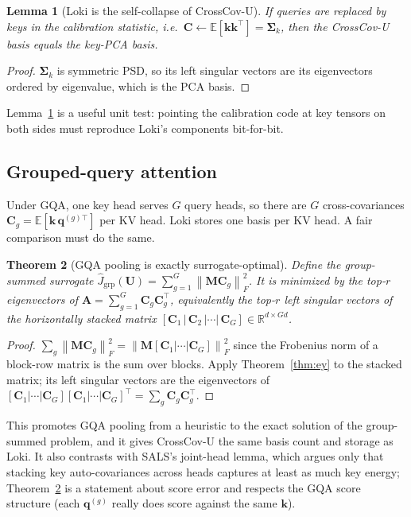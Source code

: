 \documentclass[10pt]{article}
\newcommand{\R}{\mathbb{R}}
\newcommand{\E}{\mathbb{E}}
\newcommand{\norm}[1]{\left\lVert #1 \right\rVert}
\newcommand{\fro}[1]{\norm{#1}_F}
\newcommand{\bq}{\mathbf{q}}
\newcommand{\bk}{\mathbf{k}}
\newcommand{\bU}{\mathbf{U}}
\newcommand{\bC}{\mathbf{C}}
\newcommand{\bM}{\mathbf{M}}
\newcommand{\Sk}{\bm{\Sigma}_k}
\newcommand{\method}{CrossCov-U}
\theoremstyle{plain}
\newtheorem{theorem}{Theorem}[section]
\newtheorem{lemma}[theorem]{Lemma}
\theoremstyle{definition}
\theoremstyle{remark}
\begin{document}
\begin{lemma}[Loki is the self-collapse of \method{}]
\label{lem:collapse}
If queries are replaced by keys in the calibration statistic, i.e.\
$\bC\leftarrow\E[\bk\bk^\top]=\Sk$, then the \method{} basis equals the key-PCA
basis.
\end{lemma}
\begin{proof}
$\Sk$ is symmetric PSD, so its left singular vectors are its eigenvectors
ordered by eigenvalue, which is the PCA basis.
\end{proof}
Lemma~\ref{lem:collapse} is a useful unit test: pointing the calibration code
at key tensors on both sides must reproduce Loki's components bit-for-bit.

\subsection{Grouped-query attention}
\label{sec:gqa}

Under GQA, one key head serves $G$ query heads, so there are $G$
cross-covariances $\bC_g=\E[\bk\,\bq^{(g)\top}]$ per KV head. Loki stores one
basis per KV head. A fair comparison must do the same.

\begin{theorem}[GQA pooling is exactly surrogate-optimal]
\label{thm:gqa}
Define the group-summed surrogate $\hat J_{\mathrm{grp}}(\bU)=\sum_{g=1}^G\fro{\bM\bC_g}^2$.
It is minimized by the top-$r$ eigenvectors of
$\mathbf{A}=\sum_{g=1}^G\bC_g\bC_g^\top$, equivalently the top-$r$ left
singular vectors of the horizontally stacked matrix
$[\bC_1\,|\,\bC_2\,|\cdots|\,\bC_G]\in\R^{d\times Gd}$.
\end{theorem}
\begin{proof}
$\sum_g\fro{\bM\bC_g}^2=\fro{\bM[\bC_1|\cdots|\bC_G]}^2$ since the Frobenius
norm of a block-row matrix is the sum over blocks. Apply
Theorem~\ref{thm:ey} to the stacked matrix; its left singular vectors are the
eigenvectors of $[\bC_1|\cdots|\bC_G][\bC_1|\cdots|\bC_G]^\top=\sum_g\bC_g\bC_g^\top$.
\end{proof}

This promotes GQA pooling from a heuristic to the exact solution of the
group-summed problem, and it gives \method{} the same basis count and storage
as Loki. It also contrasts with SALS's joint-head lemma, which argues only
that stacking key auto-covariances across heads captures at least as much key
energy; Theorem~\ref{thm:gqa} is a statement about score error and respects
the GQA score structure (each $\bq^{(g)}$ really does score against the same
$\bk$).
\end{document}
